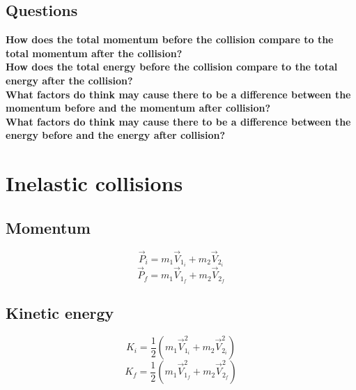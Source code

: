 \documentclass[11pt, letterpaper, includehead]{article}
\begin{document}
\subsection{Questions}
\textbf{How does the total momentum before the collision compare to the total
momentum after the collision?}\\

\textbf{How does the total energy before the collision compare to the total energy
after the collision?}\\

\textbf{What factors do think may cause there to be a difference between the
momentum before and the momentum after collision?}\\

\textbf{What factors do think may cause there to be a difference between the energy
before and the energy after collision?}\\

\section{Inelastic collisions} 
\subsection{Momentum}
$$\vec{P}_i = m_1\vec{V}_{1_i} + m_2\vec{V}_{2_i}$$
$$\vec{P}_f = m_1\vec{V}_{1_f} + m_2\vec{V}_{2_f}$$

\subsection{Kinetic energy}
$$K_i = \frac{1}{2}(m_1 \vec{V}_{1_i}^2 + m_2 \vec{V}_{2_i}^2)$$
$$K_f = \frac{1}{2}(m_1 \vec{V}_{1_f}^2 + m_2 \vec{V}_{2_f}^2)$$
\end{document}

